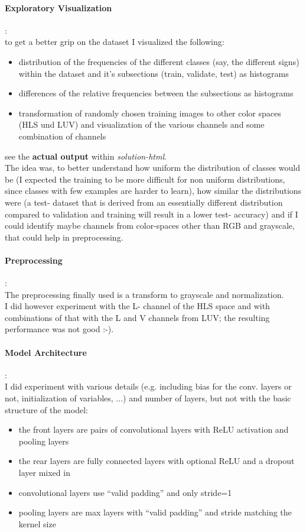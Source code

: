 \documentclass[a4paper]{article}
\begin{document}
\paragraph{Exploratory Visualization}
:\\
to get a better grip on the dataset I visualized the following:
\begin{itemize}
\item distribution of the frequencies of the different classes (say, the different signs) within the dataset and it's subsections (train, validate, test) as histograms
\item differences of the relative frequencies between the subsections as histograms
\item transformation of randomly chosen training images to other color spaces (HLS und LUV) and visualization of the various channels and some combination of channels
\end{itemize}

see the \textbf{actual output} within \textit{solution-html}.\\
The idea was, to better understand how uniform the distribution of classes would be
(I expected the training to be more difficult for non uniform distributions, since
classes with few examples are harder to learn), how similar the distributions were
(a test- dataset that is derived from an essentially different distribution compared to
validation and training will result in a lower test- accuracy) and if I could identify
maybe channels from color-spaces other than RGB and grayscale, that could help
in preprocessing.

\paragraph{Preprocessing}
:\\
The preprocessing finally used is a transform to grayscale and normalization.
\\
I did however experiment with the L- channel of the HLS space and with combinations
of that with the L and V channels from LUV; the resulting performance was not good :-).

\paragraph{Model Architecture}
:\\
I did experiment with various details (e.g. including bias for the conv. layers or not,
initialization of variables, ...) and number of layers, but not with the basic structure
of the model:
\begin{itemize}
\item the front layers are pairs of convolutional layers with ReLU activation and pooling layers
\item the rear layers are fully connected layers with optional ReLU and a dropout layer mixed in
\item convolutional layers use \enquote{valid padding} and only stride=1
\item pooling layers are max layers with \enquote{valid padding} and stride matching the kernel size
\end{itemize}
\end{document}
